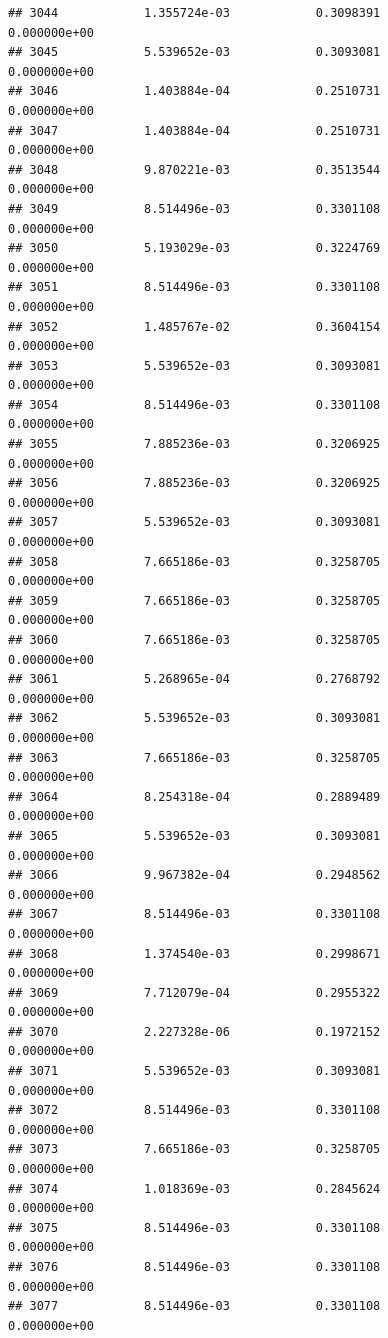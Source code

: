 \documentclass[
]{article}
\begin{document}
\begin{verbatim}
## 3044            1.355724e-03            0.3098391            0.000000e+00
## 3045            5.539652e-03            0.3093081            0.000000e+00
## 3046            1.403884e-04            0.2510731            0.000000e+00
## 3047            1.403884e-04            0.2510731            0.000000e+00
## 3048            9.870221e-03            0.3513544            0.000000e+00
## 3049            8.514496e-03            0.3301108            0.000000e+00
## 3050            5.193029e-03            0.3224769            0.000000e+00
## 3051            8.514496e-03            0.3301108            0.000000e+00
## 3052            1.485767e-02            0.3604154            0.000000e+00
## 3053            5.539652e-03            0.3093081            0.000000e+00
## 3054            8.514496e-03            0.3301108            0.000000e+00
## 3055            7.885236e-03            0.3206925            0.000000e+00
## 3056            7.885236e-03            0.3206925            0.000000e+00
## 3057            5.539652e-03            0.3093081            0.000000e+00
## 3058            7.665186e-03            0.3258705            0.000000e+00
## 3059            7.665186e-03            0.3258705            0.000000e+00
## 3060            7.665186e-03            0.3258705            0.000000e+00
## 3061            5.268965e-04            0.2768792            0.000000e+00
## 3062            5.539652e-03            0.3093081            0.000000e+00
## 3063            7.665186e-03            0.3258705            0.000000e+00
## 3064            8.254318e-04            0.2889489            0.000000e+00
## 3065            5.539652e-03            0.3093081            0.000000e+00
## 3066            9.967382e-04            0.2948562            0.000000e+00
## 3067            8.514496e-03            0.3301108            0.000000e+00
## 3068            1.374540e-03            0.2998671            0.000000e+00
## 3069            7.712079e-04            0.2955322            0.000000e+00
## 3070            2.227328e-06            0.1972152            0.000000e+00
## 3071            5.539652e-03            0.3093081            0.000000e+00
## 3072            8.514496e-03            0.3301108            0.000000e+00
## 3073            7.665186e-03            0.3258705            0.000000e+00
## 3074            1.018369e-03            0.2845624            0.000000e+00
## 3075            8.514496e-03            0.3301108            0.000000e+00
## 3076            8.514496e-03            0.3301108            0.000000e+00
## 3077            8.514496e-03            0.3301108            0.000000e+00

\end{verbatim}
\end{document}
